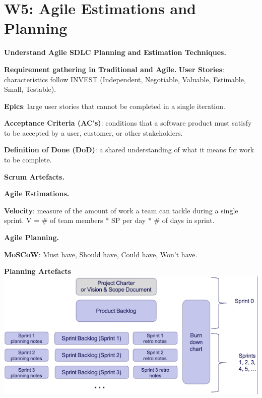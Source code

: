 \section{W5: Agile Estimations and Planning}

\textbf{Understand Agile SDLC Planning and Estimation Techniques.}

\textbf{Requirement gathering in Traditional and Agile.}
    \textbf{User Stories}: characteristics follow INVEST (Independent, Negotiable, Valuable, Estimable, Small, Testable).

    \textbf{Epics}: large user stories that cannot be completed in a single iteration.

    \textbf{Acceptance Criteria (AC's)}: conditions that a software product must satisfy to be accepted by a user, customer, or other stakeholders.

    \textbf{Definition of Done (DoD)}: a shared understanding of what it means for work to be complete.



\textbf{Scrum Artefacts.}

\textbf{Agile Estimations.}

    \textbf{Velocity}: measure of the amount of work a team can tackle during a single sprint. V = \# of team members * SP per day * \# of days in sprint.

\textbf{Agile Planning.}

    \textbf{MoSCoW}: Must have, Should have, Could have, Won't have.

    \textbf{Planning Artefacts}
    \includegraphics[width=\linewidth]{figs/SCR-20240606-lcfi.png}
